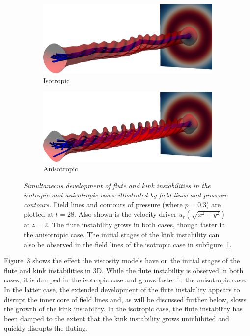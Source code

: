 \documentclass[fleqn,usenatbib]{mnras}
\newcommand{\mycaption}[2]{\caption[#1]{\emph{#1} #2}}
\begin{document}
\begin{figure}
  \centering
    \begin{subfigure}{0.49\textwidth}
      \includegraphics[width=\linewidth]{field_line_plots/cropped/v-4r-4-isotropic_0014_cropped.png}
      \caption{Isotropic}
      \label{fig:field_line_plots_iso}
    \end{subfigure}
    \hfill
    \begin{subfigure}{0.49\textwidth}
      \includegraphics[width=\linewidth]{field_line_plots/cropped/v-4r-4-switching_0014_cropped.png}
      \caption{Anisotropic}
      \label{fig:field_line_plots_swi}
    \end{subfigure}
\mycaption{Simultaneous development of flute and kink
  instabilities in the isotropic and anisotropic cases
  illustrated by field lines and pressure contours.}{Field
  lines and contours of pressure (where $p=0.3$) are plotted at
  $t=28$. Also shown is the velocity driver $u_r(\sqrt{x^2+y^2})$ at $z=2$. The flute instability grows in both cases, though faster in the anisotropic case. The initial stages of the kink instability can also be observed in the field lines of the isotropic case in subfigure~\ref{fig:field_line_plots_iso}.}
\label{fig:kink_field_line_plots}%
\end{figure}

Figure~\ref{fig:kink_field_line_plots} shows the effect the viscosity models
have on the initial stages of the flute and kink instabilities in 3D. While the
flute instability is observed in both cases, it is damped in the isotropic case
and grows faster in the anisotropic case. In the latter case, the extended
development of the flute instability appears to disrupt the inner core of field
lines and, as will be discussed further below, slows the growth of the kink
instability. In the isotropic case, the flute instability has been damped to
the extent that the kink instability grows uninhibited and quickly disrupts the
fluting. 
\end{document}
